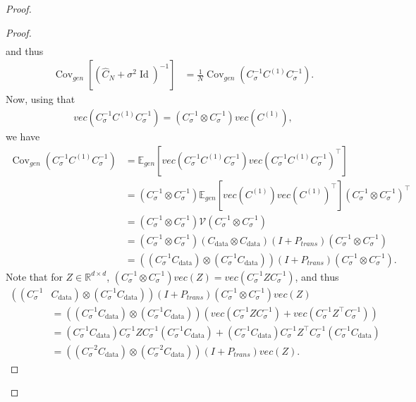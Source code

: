 \documentclass[11pt]{article}
\newcommand{\id}{\operatorname{Id}}
\newcommand{\RR}{\mathbb{R}}
\newcommand{\EE}{\mathbb{E}}
\newcommand{\cov}{\operatorname{Cov}}
\begin{document}
\begin{proof}
\begin{proof}
\begin{align*}
\end{align*}
and thus 
\begin{align*}
\cov_{gen}\left[(\hat C_N + \sigma^2\id)^{-1} \right]  &= \frac{1}{N} \cov_{gen}(C_\sigma^{-1} C^{(1)} C_\sigma^{-1}).
\end{align*}
Now, using that 
\begin{align*}
vec(C_\sigma^{-1} C^{(1)}  C_\sigma^{-1}) = (C_\sigma^{-1} \otimes C_\sigma^{-1})vec(C^{(1)}), 
\end{align*}
we have 
\begin{align*}
\cov_{gen}(C_\sigma^{-1} C^{(1)} C_\sigma^{-1}) &= \EE_{gen}[vec(C_\sigma^{-1} C^{(1)} C_\sigma^{-1})vec(C_\sigma^{-1} C^{(1)} C_\sigma^{-1})^\top] \\
&=(C_\sigma^{-1} \otimes C_\sigma^{-1})  \EE_{gen}[ vec(C^{(1)})vec(C^{(1)})^\top]   (C_\sigma^{-1} \otimes C_\sigma^{-1})^\top   \\
&= (C_\sigma^{-1} \otimes C_\sigma^{-1})  \mathcal{V}   (C_\sigma^{-1} \otimes C_\sigma^{-1}) \\
&= (C_\sigma^{-1} \otimes C_\sigma^{-1})  (C_\mathrm{data} \otimes C_\mathrm{data}) (I + P_{trans})   (C_\sigma^{-1} \otimes C_\sigma^{-1}) \\
&= \left(\left( C_\sigma^{-1} C_\mathrm{data} \right) \otimes \left( C_\sigma^{-1} C_\mathrm{data} \right)\right) (I + P_{trans})  (C_\sigma^{-1} \otimes C_\sigma^{-1}) .
\end{align*}
Note that for $Z \in \RR^{d\times d}$, $(C_\sigma^{-1} \otimes C_\sigma^{-1})vec(Z) = vec(C_\sigma^{-1} Z C_\sigma^{-1})$, and thus  
\begin{align*}
    \left(\left( C_\sigma^{-1} \right.\right. & C_\mathrm{data} \left. \left. \right) \otimes \left( C_\sigma^{-1} C_\mathrm{data} \right)\right) (I + P_{trans})(C_\sigma^{-1} \otimes C_\sigma^{-1})vec(Z) \\
    &=  (\left( C_\sigma^{-1} C_\mathrm{data} \right) \otimes \left( C_\sigma^{-1} C_\mathrm{data} \right))\left(vec(C_\sigma^{-1} Z C_\sigma^{-1}) + vec(C_\sigma^{-1} Z^\top C_\sigma^{-1})\right) \\
    &= \left( C_\sigma^{-1} C_\mathrm{data} \right) C_\sigma^{-1} Z C_\sigma^{-1}\left( C_\sigma^{-1} C_\mathrm{data} \right) + \left( C_\sigma^{-1} C_\mathrm{data} \right) C_\sigma^{-1} Z^\top C_\sigma^{-1}\left( C_\sigma^{-1} C_\mathrm{data} \right) \\
    &= ((C_\sigma^{-2} C_\mathrm{data}) \otimes (C_\sigma^{-2}C_\mathrm{data})) (I + P_{trans}) vec(Z) .
\end{align*}

\end{proof}
\end{proof}
\end{document}
